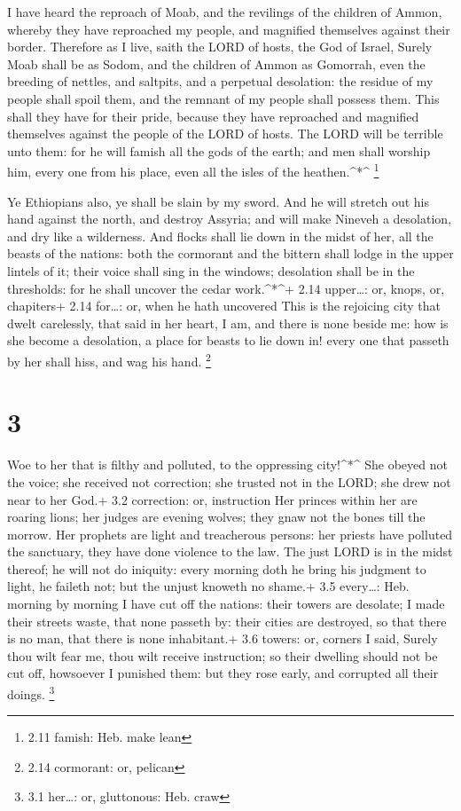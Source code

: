  I have heard the reproach of Moab, and the revilings of the
children of Ammon, whereby they have reproached my people, and magnified
themselves against their border.  Therefore as I live, saith
the LORD of hosts, the God of Israel, Surely Moab shall be as Sodom, and
the children of Ammon as Gomorrah, even the breeding of nettles, and
saltpits, and a perpetual desolation: the residue of my people shall
spoil them, and the remnant of my people shall possess them.
 This shall they have for their pride, because they have
reproached and magnified themselves against the people of the LORD of
hosts.  The LORD will be terrible unto them: for he will
famish all the gods of the earth; and men shall worship him, every one
from his place, even all the isles of the heathen.\^{}*\^{} \footnote{2.11
  famish: Heb. make lean}

 Ye Ethiopians also, ye shall be slain by my sword.
 And he will stretch out his hand against the north, and
destroy Assyria; and will make Nineveh a desolation, and dry like a
wilderness.  And flocks shall lie down in the midst of her,
all the beasts of the nations: both the cormorant and the bittern shall
lodge in the upper lintels of it; their voice shall sing in the windows;
desolation shall be in the thresholds: for he shall uncover the cedar
work.\^{}*\^{}+ 2.14 upper\ldots: or, knops, or, chapiters+ 2.14
for\ldots: or, when he hath uncovered  This is the
rejoicing city that dwelt carelessly, that said in her heart, I am, and
there is none beside me: how is she become a desolation, a place for
beasts to lie down in! every one that passeth by her shall hiss, and wag
his hand. \footnote{2.14 cormorant: or, pelican}

\hypertarget{section-2}{%
\section{3}\label{section-2}}

 Woe to her that is filthy and polluted, to the oppressing
city!\^{}*\^{}  She obeyed not the voice; she received not
correction; she trusted not in the LORD; she drew not near to her God.+
3.2 correction: or, instruction  Her princes within her are
roaring lions; her judges are evening wolves; they gnaw not the bones
till the morrow.  Her prophets are light and treacherous
persons: her priests have polluted the sanctuary, they have done
violence to the law.  The just LORD is in the midst thereof;
he will not do iniquity: every morning doth he bring his judgment to
light, he faileth not; but the unjust knoweth no shame.+ 3.5
every\ldots: Heb. morning by morning  I have cut off the
nations: their towers are desolate; I made their streets waste, that
none passeth by: their cities are destroyed, so that there is no man,
that there is none inhabitant.+ 3.6 towers: or, corners  I
said, Surely thou wilt fear me, thou wilt receive instruction; so their
dwelling should not be cut off, howsoever I punished them: but they rose
early, and corrupted all their doings. \footnote{3.1 her\ldots: or,
  gluttonous: Heb. craw}

